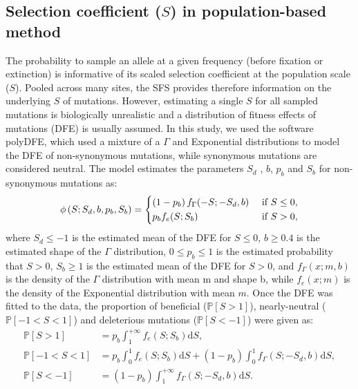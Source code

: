 \documentclass{article}
\newcommand{\der}{\textrm{d}}
\newcommand{\proba}{\mathbb{P}}
\newcommand{\Spop}{S}
\newcommand{\polyDel}{\Spop < -1}
\newcommand{\polyNeutral}{-1 < \Spop < 1}
\newcommand{\polyAdv}{ \Spop > 1}
\newcommand{\PpolyDel}{\proba \left[ \polyDel \right]}
\newcommand{\PpolyNeutral}{\proba \left[ \polyNeutral \right]}
\newcommand{\PpolyAdv}{\proba \left[ \polyAdv \right]}
\begin{document}
    \subsection{Selection coefficient ($\Spop$) in population-based method}
    \label{subsec:s-polymorphism-method}
    The probability to sample an allele at a given frequency (before fixation or extinction) is informative of its scaled selection coefficient at the population scale ($\Spop$).
    Pooled across many sites, the SFS provides therefore information on the underlying $\Spop$ of mutations.
    However, estimating a single $\Spop$ for all sampled mutations is biologically unrealistic and a distribution of fitness effects of mutations (DFE) is usually assumed\cite{eyre-walker_distribution_2006a, eyre-walker_estimating_2009a}.
    In this study, we used the software polyDFE\cite{tataru_inference_2017, tataru_polydfe_2020}, which used a mixture of a $\Gamma$ and Exponential distributions to model the DFE of non-synonymous mutations, while synonymous mutations are considered neutral.
    The model estimates the parameters $\Spop_d$ , $b$, $p_b$ and $\Spop_b$ for non-synonymous mutations as:
    \begin{equation}
        \phi \left( \Spop; \Spop_d , b, p_b, \Spop_b \right) =
        \begin{dcases}
            \left( 1 - p_b \right) f_{\Gamma}(-\Spop; -\Spop_d, b) & \text{ if $\Spop \leq 0$,} \\
            p_b f_{e}(\Spop; \Spop_b) & \text{ if $\Spop > 0$,} \\
        \end{dcases}
    \end{equation}
    where $\Spop_d \leq -1 $ is the estimated mean of the DFE for $\Spop \leq 0$,
    $b \geq 0.4$ is the estimated shape of the $\Gamma$ distribution,
    $0 \leq p_b \leq 1$ is the estimated probability that $\Spop > 0$,
    $\Spop_b \geq 1$ is the estimated mean of the DFE for $\Spop > 0$,
    and $f_{\Gamma}(x; m, b)$ is the density of the $\Gamma$ distribution with mean m and shape b, while $f_{e}(x; m)$ is the density of the Exponential distribution with mean $m$.
    Once the DFE was fitted to the data, the proportion of beneficial ($\PpolyAdv$), nearly-neutral ($\PpolyNeutral$) and deleterious mutations ($\PpolyDel$) were given as:
    \begin{align}
        \PpolyAdv &= p_b \int_{1}^{+\infty} f_{e}(\Spop; \Spop_b) \der \Spop,  \label{eq:polyProbaAdv} \\
        \PpolyNeutral &= p_b \int_{0}^{1} f_{e}(\Spop; \Spop_b) \der \Spop + \left( 1 - p_b \right) \int_{0}^{1} f_{\Gamma}(\Spop; -\Spop_d, b) \der \Spop, \\
        \PpolyDel &= \left( 1 - p_b \right) \int_{1}^{+\infty} f_{\Gamma}(\Spop; -\Spop_d, b) \der \Spop. \label{eq:polyProbaDel}
    \end{align}
\end{document}
